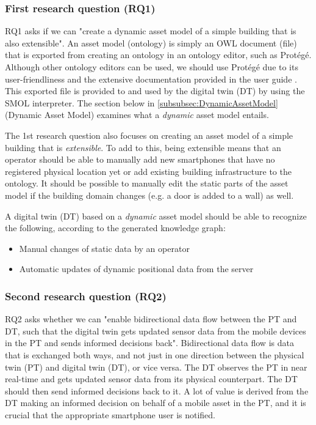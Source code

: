 \documentclass{article}
\begin{document}
\subsubsection{First research question (RQ1)}
RQ1 asks if we can "create a dynamic asset model of a simple building that is also extensible". An asset model (ontology) is simply an OWL document (file) that is exported from creating an ontology in an ontology editor, such as Protégé. Although other ontology editors can be used, we should use Protégé due to its user-friendliness and the extensive documentation provided in the user guide \cite{horridge_practical_2011}. This exported file is provided to and used by the digital twin (DT) by using the SMOL interpreter. The section below in \ref{subsubsec:DynamicAssetModel}(Dynamic Asset Model) examines what a \emph{dynamic} asset model entails. 

The 1st research question also focuses on creating an asset model of a simple building that is \emph{extensible}. To add to this, being extensible means that an operator should be able to manually add new smartphones that have no registered physical location yet or add existing building infrastructure to the ontology. It should be possible to manually edit the static parts of the asset model if the building domain changes (e.g. a door is added to a wall) as well. 

A digital twin (DT) based on a \emph{dynamic} asset model should be able to recognize the following, according to the generated knowledge graph:
\begin{itemize}
    \item Manual changes of static data by an operator
    \item Automatic updates of dynamic positional data from the server
\end{itemize}

\subsubsection{Second research question (RQ2)}\label{subsubsec:RQ2}
RQ2 asks whether we can "enable bidirectional data flow between the PT and DT, such that the digital twin gets updated sensor data from the mobile devices in the PT and sends informed decisions back". Bidirectional data flow is data that is exchanged both ways, and not just in one direction between the physical twin (PT) and digital twin (DT), or vice versa. The DT observes the PT in near real-time and gets updated sensor data from its physical counterpart. The DT should then send informed decisions back to it. A lot of value is derived from the DT making an informed decision on behalf of a mobile asset in the PT, and it is crucial that the appropriate smartphone user is notified.
\end{document}
